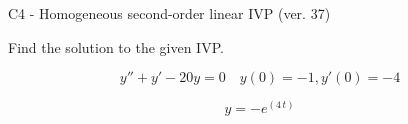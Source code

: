 \begin{exercise}
  \begin{exerciseTitle}C4 - Homogeneous second-order linear IVP (ver. 37)\end{exerciseTitle}
  \begin{exerciseStatement}
    
Find the solution to the given IVP.

    
\[y''+y'-20y = 0 \hspace{1em} y(0) = -1 , y'(0) = -4\]

  \end{exerciseStatement}
  \begin{exerciseAnswer}
    
\[y= -e^{\left(4 \, t\right)}\]

  \end{exerciseAnswer}
\end{exercise}